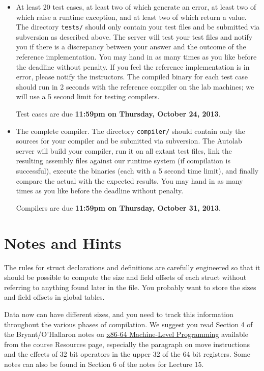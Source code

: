 \documentclass[11pt]{article}
\begin{document}
\begin{itemize}

\item At least 20 test cases, at least two of which generate an error,
  at least two of which raise a runtime exception, and at least two of
  which return a value.  The directory \verb'tests/' should only
  contain your test files and be submitted via subversion as described
  above.  The server will test your test files and notify you if there
  is a discrepancy between your answer and the outcome of the
  reference implementation.  You may hand in as many times as you like
  before the deadline without penalty.  If you feel the reference
  implementation is in error, please notify the instructors.  The
  compiled binary for each test case should run in 2 seconds with the
  reference compiler on the lab machines; we will use a 5 second limit
  for testing compilers.

  Test cases are due \textbf{11:59pm on Thursday, October 24, 2013}.

\item The complete compiler.  The directory \verb'compiler/' should
  contain only the sources for your compiler and be submitted via
  subversion.  The Autolab server will build your compiler, run it on
  all extant test files, link the resulting assembly files against our
  runtime system (if compilation is successful), execute the binaries
  (each with a 5 second time limit), and finally compare the actual
  with the expected results.  You may hand in as many times as you
  like before the deadline without penalty.

  Compilers are due \textbf{11:59pm on Thursday, October 31, 2013}.

\end{itemize}


\section{Notes and Hints}

The rules for struct declarations and definitions are carefully
engineered so that it should be possible to compute the size and field
offsets of each struct without referring to anything found later in
the file. You probably want to store the sizes and field offsets in
global tables.

Data now can have different sizes, and you need to track this
information throughout the various phases of compilation.  We suggest
you read Section 4 of the Bryant/O'Hallaron notes on
\href{http://www.cs.cmu.edu/~fp/courses/15411-f13/misc/asm64-handout.pdf}{x86-64
  Machine-Level Programming} available from the course Resources page,
especially the paragraph on move instructions and the effects of 32
bit operators in the upper 32 of the 64 bit registers.  Some notes can
also be found in Section 6 of the notes for Lecture 15.
\end{document}
